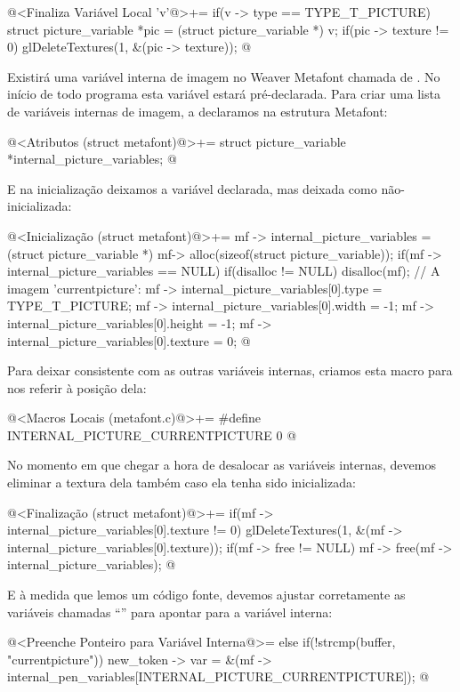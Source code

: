 \iniciocodigo
@<Finaliza Variável Local 'v'@>+=
if(v -> type == TYPE_T_PICTURE){
  struct picture_variable *pic = (struct picture_variable *) v;
  if(pic -> texture != 0)
    glDeleteTextures(1, &(pic -> texture));
}
@
\fimcodigo

Existirá uma variável interna de imagem no Weaver Metafont chamada
de . No início de todo programa esta
variável estará pré-declarada. Para criar uma lista de variáveis
internas de imagem, a declaramos na estrutura Metafont:

\iniciocodigo
@<Atributos (struct metafont)@>+=
struct picture_variable *internal_picture_variables;
@
\fimcodigo

E na inicialização deixamos a variável 
declarada, mas deixada como não-inicializada:

\iniciocodigo
@<Inicialização (struct metafont)@>+=
mf -> internal_picture_variables = (struct picture_variable *)
                                   mf-> alloc(sizeof(struct picture_variable));
if(mf -> internal_picture_variables == NULL){
  if(disalloc != NULL)
    disalloc(mf);
}
// A imagem 'currentpicture':
mf -> internal_picture_variables[0].type = TYPE_T_PICTURE;
mf -> internal_picture_variables[0].width = -1;
mf -> internal_picture_variables[0].height = -1;
mf -> internal_picture_variables[0].texture = 0;
@
\fimcodigo

Para deixar consistente com as outras variáveis internas, criamos esta
macro para nos referir à posição dela:

\iniciocodigo
@<Macros Locais (metafont.c)@>+=
#define INTERNAL_PICTURE_CURRENTPICTURE 0
@
\fimcodigo

No momento em que chegar a hora de desalocar as variáveis internas,
devemos eliminar a textura dela também caso ela tenha sido
inicializada:

\iniciocodigo
@<Finalização (struct metafont)@>+=
if(mf -> internal_picture_variables[0].texture != 0)
  glDeleteTextures(1, &(mf -> internal_picture_variables[0].texture));
if(mf -> free != NULL)
  mf -> free(mf -> internal_picture_variables);
@
\fimcodigo

E à medida que lemos um código fonte, devemos ajustar corretamente as
variáveis chamadas ``'' para apontar para a
variável interna:

\iniciocodigo
@<Preenche Ponteiro para Variável Interna@>=
else if(!strcmp(buffer, "currentpicture"))
  new_token -> var =
          &(mf -> internal_pen_variables[INTERNAL_PICTURE_CURRENTPICTURE]);
@
\fimcodigo

